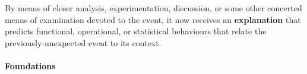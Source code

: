 \begin{center}
\asterism
\end{center}



\begin{defn}\label{def:explanation}
\hypertarget{def:explanation}{}By means of closer analysis,
experimentation, discussion, or some other concerted means of
examination devoted to the event, it now receives an
\textbf{explanation} that predicts functional, operational, or
statistical behaviours that relate the previously-unexpected event to
its context.
\end{defn}
\paragraph{\textbf{\upshape Foundations}}
                                         
